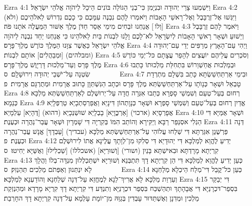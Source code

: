Ezra 4:1	וַיִּשְׁמְעוּ צָרֵי יְהוּדָה וּבִנְיָמִן כִּי־בְנֵי הַגּוֹלָה בּוֹנִים הֵיכָל לַיהֹוָה אֱלֹהֵי יִשְׂרָאֵל׃
Ezra 4:2	וַיִּגְּשׁוּ אֶל־זְרֻבָּבֶל וְאֶל־רָאשֵׁי הָאָבוֹת וַיֹּאמְרוּ לָהֶם נִבְנֶה עִמָּכֶם כִּי כָכֶם נִדְרוֹשׁ לֵאלֹהֵיכֶם (ולא) [וְלוֹ ] אֲנַחְנוּ זֹבְחִים מִימֵי אֵסַר חַדֹּן מֶלֶךְ אַשּׁוּר הַמַּעֲלֶה אֹתָנוּ פֹּה׃
Ezra 4:3	וַיֹּאמֶר לָהֶם זְרֻבָּבֶל וְיֵשׁוּעַ וּשְׁאָר רָאשֵׁי הָאָבוֹת לְיִשְׂרָאֵל לֹא־לָכֶם וָלָנוּ לִבְנוֹת בַּיִת לֵאלֹהֵינוּ כִּי אֲנַחְנוּ יַחַד נִבְנֶה לַיהֹוָה אֱלֹהֵי יִשְׂרָאֵל כַּאֲשֶׁר צִוָּנוּ הַמֶּלֶךְ כּוֹרֶשׁ מֶלֶךְ־פָּרָס׃
Ezra 4:4	וַיְהִי עַם־הָאָרֶץ מְרַפִּים יְדֵי עַם־יְהוּדָה (ומבלהים) [וּמְבַהֲלִים] אוֹתָם לִבְנוֹת׃
Ezra 4:5	וְסֹכְרִים עֲלֵיהֶם יוֹעֲצִים לְהָפֵר עֲצָתָם כּל־יְמֵי כּוֹרֶשׁ מֶלֶךְ פָּרַס וְעַד־מַלְכוּת דָּרְיָוֶשׁ מֶלֶךְ־פָּרָס׃
Ezra 4:6	וּבְמַלְכוּת אֲחַשְׁוֵרוֹשׁ בִּתְחִלַּת מַלְכוּתוֹ כָּתְבוּ שִׂטְנָה עַל־יֹשְׁבֵי יְהוּדָה וִירוּשָׁלָ͏ִם׃ {ס}        
Ezra 4:7	וּבִימֵי אַרְתַּחְשַׁשְׂתָּא כָּתַב בִּשְׁלָם מִתְרְדָת טָבְאֵל וּשְׁאָר כְּנָוֺתָו עַל־אַרְתַּחְשַׁשְׂתְּא מֶלֶךְ פָּרָס וּכְתָב הַנִּשְׁתְּוָן כָּתוּב אֲרָמִית וּמְתֻרְגָּם אֲרָמִית׃ {פ}
Ezra 4:8	רְחוּם בְּעֵל־טְעֵם וְשִׁמְשַׁי סָפְרָא כְּתַבוּ אִגְּרָה חֲדָה עַל־יְרוּשְׁלֶם לְאַרְתַּחְשַׁשְׂתְּא מַלְכָּא כְּנֵמָא׃
Ezra 4:9	אֱדַיִן רְחוּם בְּעֵל־טְעֵם וְשִׁמְשַׁי סָפְרָא וּשְׁאָר כְּנָוָתְהוֹן דִּינָיֵא וַאֲפַרְסַתְכָיֵא טַרְפְּלָיֵא אֲפָרְסָיֵא (ארכוי) [אַרְכֳּוָיֵא] בָבְלָיֵא שׁוּשַׁנְכָיֵא (דהוא) [דֶּהָיֵא] עֵלְמָיֵא׃
Ezra 4:10	וּשְׁאָר אֻמַּיָּא דִּי הַגְלִי אסְנַפַּר רַבָּא וְיַקִּירָא וְהוֹתֵב הִמּוֹ בְּקִרְיָה דִּי שָׁמְרָיִן וּשְׁאָר עֲבַר־נַהֲרָה וּכְעֶנֶת׃
Ezra 4:11	דְּנָה פַּרְשֶׁגֶן אִגַּרְתָּא דִּי שְׁלַחוּ עֲלוֹהִי עַל־אַרְתַּחְשַׁשְׂתְּא מַלְכָּא (עבדיך) [עַבְדָךְ] אֱנָשׁ עֲבַר־נַהֲרָה וּכְעֶנֶת׃ {פ}
Ezra 4:12	יְדִיעַ לֶהֱוֵא לְמַלְכָּא דִּי יְהוּדָיֵא דִּי סְלִקוּ מִן־לְוָתָךְ עֲלֶינָא אֲתוֹ לִירוּשְׁלֶם קִרְיְתָא מָרָדְתָּא וּבִאישְׁתָּא בָּנַיִן (ושורי) [וְשׁוּרַיָּא] (אשכללו) [שַׁכְלִילוּ] וְאֻשַּׁיָּא יַחִיטוּ׃ {ס}        
Ezra 4:13	כְּעַן יְדִיעַ לֶהֱוֵא לְמַלְכָּא דִּי הֵן קִרְיְתָא דָךְ תִּתְבְּנֵא וְשׁוּרַיָּא יִשְׁתַּכְלְלוּן מִנְדָּה־בְלוֹ וַהֲלָךְ לָא יִנְתְּנוּן וְאַפְּתֹם מַלְכִים תְּהַנְזִק׃ {ס}        
Ezra 4:14	כְּעַן כּל־קֳבֵל דִּי־מְלַח הֵיכְלָא מְלַחְנָא וְעַרְוַת מַלְכָּא לָא אֲרִיךְ־לַנָא לְמֶחֱזֵא עַל־דְּנָה שְׁלַחְנָא וְהוֹדַעְנָא לְמַלְכָּא׃
Ezra 4:15	דִּי יְבַקַּר בִּסְפַר־דּכְרָנַיָּא דִּי אֲבָהָתָךְ וּתְהַשְׁכַּח בִּסְפַר דּכְרָנַיָּא וְתִנְדַּע דִּי קִרְיְתָא דָךְ קִרְיָא מָרָדָא וּמְהַנְזְקַת מַלְכִין וּמְדִנָן וְאֶשְׁתַּדּוּר עָבְדִין בְּגַוַּהּ מִן־יוֹמָת עָלְמָא עַל־דְּנָה קִרְיְתָא דָךְ החָרְבַת׃
